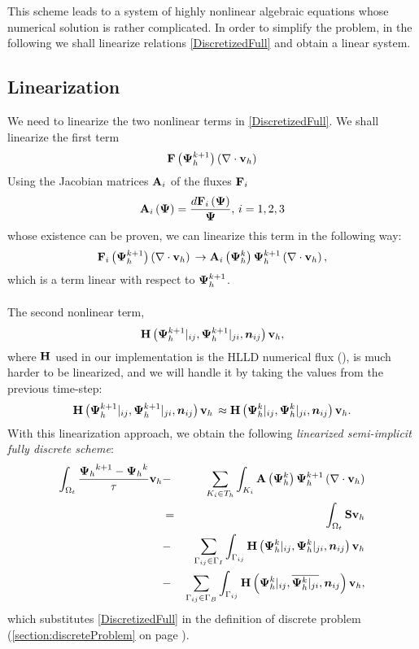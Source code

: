 This scheme leads to a system of highly nonlinear algebraic equations whose numerical solution is rather complicated. In order to simplify the problem, in the following we shall linearize relations \ref{DiscretizedFull} and obtain a linear system.
\subsection{Linearization}
We need to linearize the two nonlinear terms in \ref{DiscretizedFull}. We shall linearize the first term
$$
\mathrm{\mathbf{F}}\left({\mathrm{\mathbf{\Psi}}_h^{k+1}}\right) \left(\nabla \cdot \mathrm{\mathbf{v}}_h\right)
$$
Using the Jacobian matrices $\mathrm{\mathbf{A}}_i$ of the fluxes $\mathrm{\mathbf{F}}_i$
$$
\mathrm{\mathbf{A}}_i\left({\mathrm{\mathbf{\Psi}}}\right) = \frac{d\mathrm{\mathbf{F}}_i\left({\mathrm{\mathbf{\Psi}}}\right)}{\mathrm{\mathbf{\Psi}}},\,i = 1, 2, 3
$$
whose existence can be proven, we can linearize this term in the following way:
$$
\mathrm{\mathbf{F}}_i\left({\mathrm{\mathbf{\Psi}}_h^{k+1}}\right) \left(\nabla \cdot \mathrm{\mathbf{v}}_h\right)\,\rightarrow \mathrm{\mathbf{A}}_i\left({\mathrm{\mathbf{\Psi}}_h^{k}}\right) \mathrm{\mathbf{\Psi}}_h^{k+1} \left(\nabla \cdot \mathrm{\mathbf{v}}_h\right),
$$
which is a term linear with respect to $\mathrm{\mathbf{\Psi}}_h^{k+1}$.

\paragraph{}
The second nonlinear term,
$$
\mathrm{\mathbf{H}}\left({\mathrm{\mathbf{\Psi}}_h^{k+1}}|_{ij}, {\mathrm{\mathbf{\Psi}}_h^{k+1}}|_{ji}, \mbox{\boldmath $n$}_{ij}\right) \mathrm{\mathbf{v}}_h,
$$
where $\mathrm{\mathbf{H}}$ used in our implementation is the HLLD numerical flux (\cite{hlld}), is much harder to be linearized, and we will handle it by taking the values from the previous time-step:
$$
\mathrm{\mathbf{H}}\left({\mathrm{\mathbf{\Psi}}_h^{k+1}}|_{ij}, {\mathrm{\mathbf{\Psi}}_h^{k+1}}|_{ji}, \mbox{\boldmath $n$}_{ij}\right) \mathrm{\mathbf{v}}_h\,\approx  \mathrm{\mathbf{H}}\left({\mathrm{\mathbf{\Psi}}_h^{k}}|_{ij}, {\mathrm{\mathbf{\Psi}}_h^{k}}|_{ji}, \mbox{\boldmath $n$}_{ij}\right) \mathrm{\mathbf{v}}_h.
$$
With this linearization approach, we obtain the following \textit{linearized semi-implicit fully discrete scheme}:
\begin{eqnarray}
\label{DiscretizedLinear} \int_{\Omega_{t}} \frac{{\mathrm{\mathbf{\Psi}}_h}^{k+1} - {\mathrm{\mathbf{\Psi}}_h}^{k}}{\tau} \mathrm{\mathbf{v}}_h & - & \sum_{K_i \in T_h}\int_{K_i}\mathrm{\mathbf{A}}\left({\mathrm{\mathbf{\Psi}}_h^{k}}\right) \mathrm{\mathbf{\Psi}}_h^{k+1} \left(\nabla \cdot \mathrm{\mathbf{v}}_h\right)\\\nonumber & = & \int_{\Omega_{t}} \mathrm{\mathbf{S}} \mathrm{\mathbf{v}}_h\\\nonumber & - &\sum_{\Gamma_{ij}\in\Gamma_I} \int_{\Gamma_{ij}}\mathrm{\mathbf{H}}\left({\mathrm{\mathbf{\Psi}}_h^{k}}|_{ij}, {\mathrm{\mathbf{\Psi}}_h^{k}}|_{ji}, \mbox{\boldmath $n$}_{ij}\right) \mathrm{\mathbf{v}}_h
\\\nonumber & - &\sum_{\Gamma_{ij}\in\Gamma_B} \int_{\Gamma_{ij}} \mathrm{\mathbf{H}}\left({\mathrm{\mathbf{\Psi}}_h^{k}}|_{ij}, \overline{{\mathrm{\mathbf{\Psi}}_h^{k}}|_{ji}}, \mbox{\boldmath $n$}_{ij}\right) \mathrm{\mathbf{v}}_h,
\end{eqnarray}
which substitutes \ref{DiscretizedFull} in the definition of discrete problem (\ref{section:discreteProblem} on page \pageref{section:discreteProblem}).